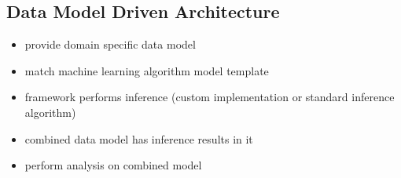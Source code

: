 \subsection{Data Model Driven Architecture}

\begin{itemize}
\item provide domain specific data model
\item match machine learning algorithm model template
\item framework performs inference (custom implementation or standard inference algorithm)
\item combined data model has inference results in it
\item perform analysis on combined model
\end{itemize}
